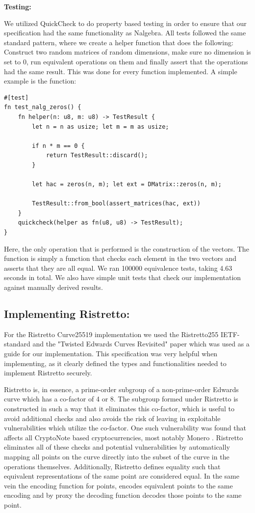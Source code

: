 \documentclass{article}
\newcommand*\ttvar[1]{\texttt{\expandafter\dottvar\detokenize{#1}\relax}}
\newcommand*\dottvar[1]{\ifx\relax#1\else
  \expandafter\ifx\string_#1\string_\allowbreak\else#1\fi
  \expandafter\dottvar\fi}
\begin{document}
\textbf{Testing:}

We utilized QuickCheck to do property based testing in order to ensure
that our specification had the same functionality as Nalgebra. All tests 
followed the same standard pattern, where we create a helper function 
that does the following: Construct two random matrices of random 
dimensions, make sure no dimension is set to 0, run equivalent
operations on them and finally assert that the operations had the same
result. This was done for every function implemented. A simple example 
is the \ttvar{zeros} function:

\begin{lstlisting}
#[test]
fn test_nalg_zeros() {
	fn helper(n: u8, m: u8) -> TestResult {
		let n = n as usize; let m = m as usize;

		if n * m == 0 {
		    return TestResult::discard();
		}

		let hac = zeros(n, m); let ext = DMatrix::zeros(n, m);

		TestResult::from_bool(assert_matrices(hac, ext))
	}
	quickcheck(helper as fn(u8, u8) -> TestResult);
}
\end{lstlisting}

Here, the only operation that is performed is the construction of the
vectors. The \ttvar{assert_matrices} function is simply a function
that checks each element in the two vectors and asserts that they are 
all equal. We ran 100000 equivalence tests, taking 4.63 seconds in
total. We also have simple unit tests that check our implementation
against manually derived results.

\subsection{Implementing Ristretto:} \label{implementing-ristretto}

For the Ristretto Curve25519 implementation we used the Ristretto255
IETF-standard \cite{ristretto-ietf} and the "Twisted Edwards Curves
Revisited" paper \cite{edwards-curves} which was used as a guide for our
implementation. This specification was very helpful when implementing,
as it clearly defined the types and functionalities needed to implement
Ristretto securely.

Ristretto is, in essence, a prime-order subgroup of a non-prime-order
Edwards curve which has a co-factor of 4 or 8. The subgroup formed
under Ristretto is constructed in such a way that it eliminates this
co-factor, which is useful to avoid additional checks and also avoids
the risk of leaving in exploitable vulnerabilities which utilize the
co-factor. One such vulnerability was found that affects all CryptoNote
based cryptocurrencies, most notably Monero \cite{cryptonote}. Ristretto
eliminates all of these checks and potential vulnerabilities by
automatically mapping all points on the curve directly into the subset
of the curve in the operations themselves. Additionally, Ristretto
defines equality such that equivalent representations of the same point
are considered equal. In the same vein the encoding function for points,
encodes equivalent points to the same encoding and by proxy the decoding
function decodes those points to the same point.
\end{document}
